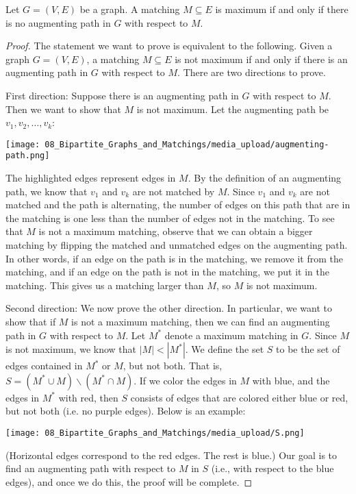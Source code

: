 \begin{flex}
\label{grp:theorem:Characterization-for-maximum-matchings}

\begin{theorem}
\label{theorem:Characterization-for-maximum-matchings}
Let $G=(V,E)$ be a graph. A matching $M \subseteq E$ is maximum if and only if there is no augmenting path in $G$ with respect to $M$.

\end{theorem}

\begin{proof}
\label{prf:matchings-in-graphs::statement}
The statement we want to prove is equivalent to the following. Given a graph $G = (V,E)$, a matching $M \subseteq E$ is not maximum if and only if there is an augmenting path in $G$ with respect to $M$. There are two directions to prove.

\noindent
First direction: Suppose there is an augmenting path in $G$ with respect to $M$. Then we want to show that $M$ is not maximum. Let the augmenting path be $v_1,v_2,\ldots,v_k$:
\begin{center}
    \texttt{[image: 08\_Bipartite\_Graphs\_and\_Matchings/media\_upload/augmenting-path.png]}
\end{center}
The highlighted edges represent edges in $M$. By the definition of an augmenting path, we know that $v_1$ and $v_k$ are not matched by $M$. Since $v_1$ and $v_k$ are not matched and the path is alternating, the number of edges on this path that are in the matching is one less than the number of edges not in the matching. To see that $M$ is not a maximum matching, observe that we can obtain a bigger matching by flipping the matched and unmatched edges on the augmenting path. In other words, if an edge on the path is in the matching, we remove it from the matching, and if an edge on the path is not in the matching, we put it in the matching. This gives us a matching larger than $M$, so $M$ is not maximum.

\noindent
Second direction: We now prove the other direction. In particular, we want to show that if $M$ is not a maximum matching, then we can find an augmenting path in $G$ with respect to $M$. Let $M^*$ denote a maximum matching in $G$. Since $M$ is not maximum, we know that $|M| < |M^*|$. We define the set $S$ to be the set of edges contained in $M^*$ or $M$, but not both. That is, $S =  (M^* \cup M) \backslash (M^* \cap M)$. If we color the edges in $M$ with blue, and the edges in $M^*$ with red, then $S$ consists of edges that are colored either blue or red, but not both (i.e. no purple edges). Below is an example:
\begin{center}
    \texttt{[image: 08\_Bipartite\_Graphs\_and\_Matchings/media\_upload/S.png]}
\end{center}
(Horizontal edges correspond to the red edges. The rest is blue.) Our goal is to find an augmenting path with respect to $M$ in $S$ (i.e., with respect to the blue edges), and once we do this, the proof will be complete. 


\end{proof}
\end{flex}
